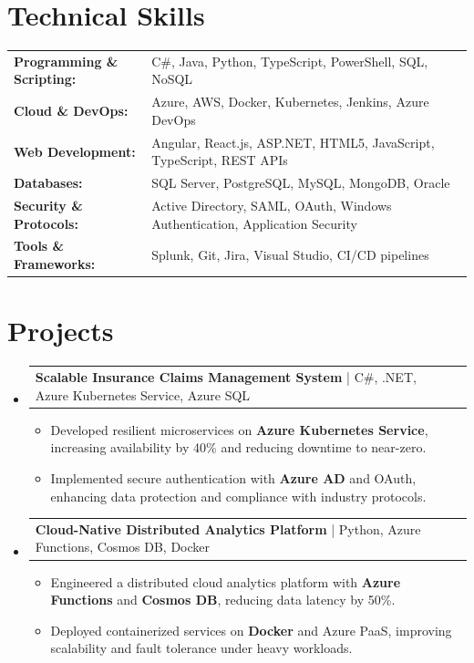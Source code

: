 \documentclass[letterpaper,10pt]{article}
\makeatletter
\newcommand{\resumeItem}[1]{
  \item{\fontsize{8pt}{9pt}\selectfont
    #1 \vspace{-3pt}
  }
}
\newcommand{\resumeProjectHeading}[2]{
    \item
    \begin{tabular*}{1.001\textwidth}{l@{\extracolsep{\fill}}r}
      \fontsize{8.5pt}{10pt}#1 & \textbf{\fontsize{8.5pt}{10pt} #2}\\
    \end{tabular*}\vspace{-7pt}
}
\newcommand{\resumeSubHeadingListStart}{\begin{itemize}[leftmargin=0pt, label={}]}
\newcommand{\resumeSubHeadingListEnd}{\end{itemize}}
\newcommand{\resumeItemListStart}{\begin{itemize}[leftmargin=*]}
\newcommand{\resumeItemListEnd}{\end{itemize}\vspace{-5pt}}
\makeatother
\begin{document}
\section{Technical Skills}
        \vspace{-14pt}
        \begin{table}[h]
            \fontsize{8pt}{9pt}\selectfont
            \begin{tabular}{p{0.3\linewidth} p{0.7\linewidth}}
                \textbf{Programming \& Scripting:} & C\#, Java, Python, TypeScript, PowerShell, SQL, NoSQL \\
                \textbf{Cloud \& DevOps:} & Azure, AWS, Docker, Kubernetes, Jenkins, Azure DevOps \\
                \textbf{Web Development:} & Angular, React.js, ASP.NET, HTML5, JavaScript, TypeScript, REST APIs \\
                \textbf{Databases:} & SQL Server, PostgreSQL, MySQL, MongoDB, Oracle \\
                \textbf{Security \& Protocols:} & Active Directory, SAML, OAuth, Windows Authentication, Application Security \\
                \textbf{Tools \& Frameworks:} & Splunk, Git, Jira, Visual Studio, CI/CD pipelines \\
            \end{tabular}
        \end{table}
 \vspace{-18pt}

\section{Projects}
    \vspace{-5pt}
    \resumeSubHeadingListStart
          \resumeProjectHeading
            {\textbf{Scalable Insurance Claims Management System} | C\#, .NET, Azure Kubernetes Service, Azure SQL}{}
            \resumeItemListStart
                \resumeItem{Developed resilient microservices on \textbf{Azure Kubernetes Service}, increasing availability by 40\% and reducing downtime to near-zero.}
                \resumeItem{Implemented secure authentication with \textbf{Azure AD} and OAuth, enhancing data protection and compliance with industry protocols.}
            \resumeItemListEnd
        \vspace{-12pt}
    
        \resumeProjectHeading
            {\textbf{Cloud-Native Distributed Analytics Platform} | Python, Azure Functions, Cosmos DB, Docker}{}
        \resumeItemListStart
                \resumeItem{Engineered a distributed cloud analytics platform with \textbf{Azure Functions} and \textbf{Cosmos DB}, reducing data latency by 50\%.}
                \resumeItem{Deployed containerized services on \textbf{Docker} and Azure PaaS, improving scalability and fault tolerance under heavy workloads.}
        \resumeItemListEnd
    \resumeSubHeadingListEnd
\end{document}

